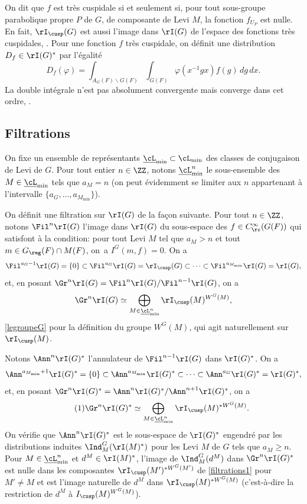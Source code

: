 On dit que $f$ est très cuspidale si et seulement si, pour tout sous-groupe parabolique propre $P$ de $G$, de composante de Levi $M$, la fonction $f_{U_{P}}$ est nulle. En fait, $\rI_{\cusp}(G)$ est aussi l'image dans $\rI(G)$ de l'espace des fonctions très cuspidales, \cf \cite[Lem.\,2.7]{W3}. Pour une fonction $f$ très cuspidale, on définit une distribution $D_{f}\in \rI(G)^*$ par l'égalité
\[
D_{f}(\varphi)=\int_{A_{G}(F)\backslash G(F)}\int_{G(F)}\varphi(x^{-1}gx)f(g)\,dg\,dx.
\]
La double intégrale n'est pas absolument convergente mais converge dans cet ordre, \cf \cite[Lem.\,9]{W2}.

\subsection{Filtrations}\label{filtrations}

On fixe un ensemble de représentants $\underline{\cL}_{\min}\subset \cL_{\min}$ des classes de conjugaison de Levi de $G$. Pour tout entier $n\in \ZZ$, notons $\underline{\cL}_{\min}^n$ le sous-ensemble des $M\in \underline{\cL}_{\min}$ tels que $ a_{M}=n$ (on peut évidemment se limiter aux $n$ appartenant à l'intervalle $\{a_{G},\dots,a_{M_{\min}}\}$).

On définit une filtration sur $\rI(G)$ de la façon suivante. Pour tout $n \in \ZZ$, notons $\Fil^n\rI(G)$ l'image dans $\rI(G)$ du sous-espace des $f\in C_{\rc}^{\infty}(G(F))$ qui satisfont à la condition: pour tout Levi $M$ tel que $a_{M}>n$ et tout $m\in G_{\reg}(F)\cap M(F)$, on~a $I^G(m,f)=0$. On a
\[
\Fil^{a_{G}-1}\rI(G)=\{0\}\subset \Fil^{a_{G}}\rI(G)=\rI_{\cusp}(G)\subset\cdots\subset \Fil^{a_{M_{\min}}}\rI(G)=\rI(G),
\]
et, en posant $\Gr^n\rI(G)=\Fil^n\rI(G)/\Fil^{n-1}\rI(G)$, on a
\[
\Gr^n\rI(G)\simeq \bigoplus_{M\in \underline{\cL}_{\min}^n}\rI_{\cusp}(M)^{ W^G(M)},
\]
\cf \ref{legroupeG} pour la définition du groupe $W^G(M)$, qui agit naturellement sur $\rI_{\cusp}(M)$.

Notons $\Ann^n\rI(G)^*$ l'annulateur de $\Fil^{n-1}\rI(G)$ dans $\rI(G)^*$. On a
\[
\Ann^{a_{M_{\min}}+1}\rI(G)^*=\{0\}\subset \Ann^{a_{M_{\min}}}\rI(G)^*\subset\cdots\subset \Ann^{a_{G}}\rI(G)^*=\rI(G)^*,
\]
et, en posant $\Gr^n\rI(G)^*=\Ann^n\rI(G)^*/\Ann^{n+1}\rI(G)^*$, on a
\begin{equation}\tag{1}\label{filtrations1}
\Gr^n\rI(G)^*\simeq \bigoplus_{M\in \underline{\cL}_{\min}^n}\rI_{\cusp}(M)^{* W^G(M)}.
\end{equation}
On vérifie que $\Ann^n\rI(G)^*$ est le sous-espace de $\rI(G)^*$ engendré par les distributions induites $\Ind_{M}^G(\rI(M)^*)$ pour les Levi $M$ de $G$ tels que $a_{M}\geq n$. Pour $M\in \underline{\cL}_{\min}^n$ et $d^M\in \rI(M)^*$, l'image de $\Ind_{M}^G(d^M)$ dans $\Gr^n\rI(G)^*$ est nulle dans les composantes $\rI_{\cusp}(M')^{* W^G(M')}$ de \eqref{filtrations1} pour $M'\neq M$ et est l'image naturelle de $d^M$ dans $\rI_{\cusp}(M)^{* W^G(M)}$ (c'est-à-dire la restriction de $d^{M}$ à $I_{\cusp}(M)^{ W^G(M)}$).

